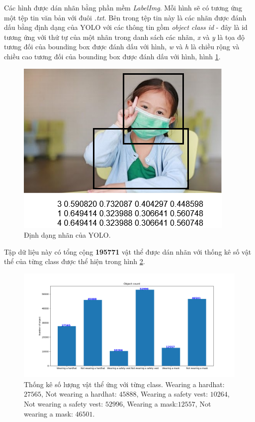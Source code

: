 Các hình được dán nhãn bằng phần mềm \emph{LabelImg}\cite{tzu:2018:labelimg}. Mỗi hình sẽ có tương ứng một tệp tin văn bản với đuôi \emph{.txt}. Bên trong tệp tin này là các nhãn được đánh dấu bằng định dạng của YOLO với các thông tin gồm \emph{object class id} - đây là id tương ứng với thứ tự của một nhãn trong danh sách các nhãn, \emph{x} và \emph{y} là tọa độ tương đối của bounding box được đánh dấu với hình, \emph{w} và \emph{h} là chiều rộng và chiều cao tương đối của bounding box được đánh dấu với hình, hình \ref{fig:yolo_annotation}.
\begin{figure}[ht!]
	\centerline{\includegraphics[scale=0.6]{images/yolo_annotation.png}}
  	\caption{Định dạng nhãn của YOLO.}
  	\label{fig:yolo_annotation}
\end{figure}

Tập dữ liệu này có tổng cộng \textbf{195771} vật thể được dán nhãn với thống kê số vật thể của từng class được thể hiện trong hình \ref{fig:object_count}.
\begin{figure}[ht!]
	\centerline{\includegraphics[scale=0.5]{images/object_count.png}}
  	\caption{Thống kê số lượng vật thể ứng với từng class. Wearing a hardhat: $27565$, Not wearing a hardhat: $45888$, Wearing a safety vest: $10264$, Not wearing a safety vest: $52996$, Wearing a mask:$12557$, Not wearing a mask: $46501$.}
  	\label{fig:object_count}
\end{figure}

